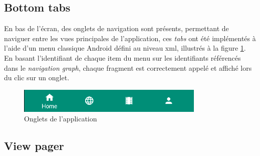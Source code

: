 \subsection{Bottom tabs}
En bas de l'écran, des onglets de navigation sont présents, permettant de naviguer entre les vues principales de l'application, ces \textit{tabs} ont été implémentés à l'aide d'un menu classique Android défini au niveau \acrshort{xml}, illustrés à la figure \ref{tabs}. En basant l'identifiant de chaque item du menu sur les identifiants référencés dans le \textit{navigation graph}, chaque fragment est correctement appelé et affiché lors du clic sur un onglet.
\begin{figure}
    \begin{center}
        \includegraphics[width=0.8\textwidth]{img/screenshots/Bottom_Tabs.png}
    \end{center}
    \caption{Onglets de l'application}
    \label{tabs}
\end{figure}

\subsection{View pager}


